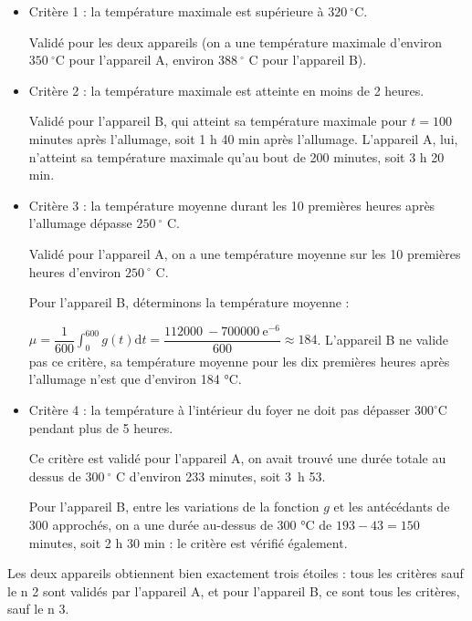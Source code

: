 \documentclass[10pt]{article}
\providecommand{\degres}{\ensuremath{^\circ}}
\providecommand{\e}{{\mathrm{e}}}
\providecommand{\np}[2][]{{#2~#1}}
\renewcommand{\d}{{\mathrm{d}}}
\providecommand{\degres}{{^\circ}}
\begin{document}
\begin{itemize}
\item Critère 1 : la température maximale est supérieure à $320~\degres$C.

	Validé pour les deux appareils (on a une température maximale d'environ $350~\degres$C pour l'appareil A, environ $388~\degres$ C pour l'appareil B).

\item Critère 2 : la température maximale est atteinte en moins de 2 heures.

Validé pour l'appareil B, qui atteint sa température maximale pour $t = 100$ minutes après l'allumage, soit 1 h 40 min après l'allumage. L'appareil A, lui, n'atteint sa température maximale qu'au bout de 200 minutes, soit 3 h 20 min.
\item Critère 3 : la température moyenne durant les 10 premières heures après l'allumage dépasse $250~\degres$ C.

Validé pour l'appareil A, on a une température moyenne sur les 10 premières heures d'environ $250~\degres$ C.

Pour l'appareil B, déterminons la température moyenne :

$\mu = \dfrac{1}{600} \displaystyle \int_{0}^{600}g(t) \d t = \dfrac{\np{112000} - \np{700000}\e^{-6}}{600} \approx 184$. L'appareil B ne valide pas ce critère, sa température moyenne pour les dix premières heures après l'allumage n'est que d'environ 184 °C.

\item Critère 4 : la température à l'intérieur du foyer ne doit pas dépasser $300^{\circ} \mathrm{C}$ pendant plus de 5 heures.

Ce critère est validé pour l'appareil A, on avait trouvé une durée totale au dessus de $300~\degres$ C d'environ 233 minutes, soit 3~h 53.

Pour l'appareil B, entre les variations de la fonction $g$ et les antécédants de 300 approchés, on a une durée au-dessus de 300 °C de $193 - 43 = 150$ minutes, soit 2 h 30 min : le critère est vérifié également.
\end{itemize}

Les deux appareils obtiennent bien exactement trois étoiles : tous les critères sauf le n 2 sont validés par l'appareil A, et pour l'appareil B, ce sont tous les critères, sauf le n 3.
\end{document}
